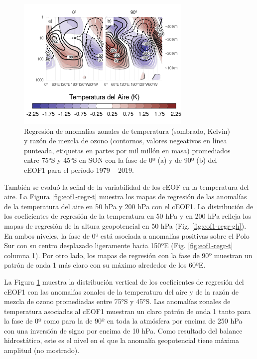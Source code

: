 \documentclass[12pt,oneside]{reedthesis}
\begin{document}
\begin{figure}
\includegraphics{figures/20-ceofs/t-vertical-1} \caption{Regresión de anomalías zonales de temperatura (sombrado, Kelvin) y razón de mezcla de ozono (contornos, valores negeativos en línea punteada, etiquetas en partes por mil millón en masa) promediados entre 75°S y 45°S en SON con la fase de 0º (a) y de 90º (b) del cEOF1 para el período 1979 -- 2019.}\label{fig:t-vertical}
\end{figure}

También se evaluó la señal de la variabilidad de los cEOF en la temperatura del aire.
La Figura \ref{fig:eof1-regr-t} muestra los mapas de regresión de las anomalías de la temperatura del aire en 50 hPa y 200 hPa con el cEOF1.
La distribución de los coeficientes de regresión de la temperatura en 50 hPa y en 200 hPa refleja los mapas de regresión de la altura geopotencial en 50 hPa (Fig. \ref{fig:eof1-regr-gh}).
En ambos niveles, la fase de 0º está asociada a anomalías positivas sobre el Polo Sur con su centro desplazado ligeramente hacia 150ºE (Fig. \ref{fig:eof1-regr-t} columna 1).
Por otro lado, los mapas de regresión con la fase de 90º muestran un patrón de onda 1 más claro con su máximo alrededor de los 60ºE.

La Figura \ref{fig:t-vertical} muestra la distribución vertical de los coeficientes de regresión del cEOF1 con las anomalías zonales de la temperatura del aire y de la razón de mezcla de ozono promediadas entre 75°S y 45°S.
Las anomalías zonales de temperatura asociadas al cEOF1 muestran un claro patrón de onda 1 tanto para la fase de 0º como para la de 90º en toda la atmósfera por encima de 250 hPa con una inversión de signo por encima de 10 hPa.
Como resultado del balance hidrostático, este es el nivel en el que la anomalía geopotencial tiene máxima amplitud (no mostrado).
\end{document}
